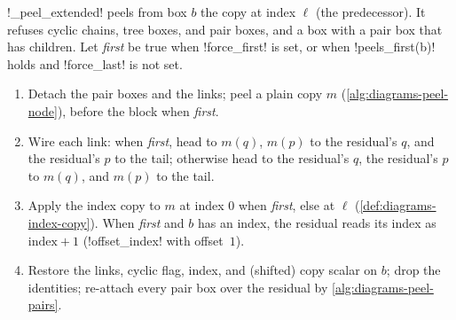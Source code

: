 \begin{algorithm}\label{alg:diagrams-peel-extended}
\py!_peel_extended! peels from box $b$ the copy at index $\ell$ (the predecessor). It refuses cyclic chains, tree boxes, and pair boxes, and a box with a pair box that has children. Let \emph{first} be true when \py!force_first! is set, or when \py!peels_first(b)! holds and \py!force_last! is not set.
\begin{enumerate}
\item Detach the pair boxes and the links; peel a plain copy $m$ (\cref{alg:diagrams-peel-node}), before the block when \emph{first}.
\item Wire each link: when \emph{first}, head to $m(q)$, $m(p)$ to the residual's $q$, and the residual's $p$ to the tail; otherwise head to the residual's $q$, the residual's $p$ to $m(q)$, and $m(p)$ to the tail.
\item Apply the index copy to $m$ at index $0$ when \emph{first}, else at $\ell$ (\cref{def:diagrams-index-copy}). When \emph{first} and $b$ has an index, the residual reads its index as $\text{index}+1$ (\py!offset_index! with offset~$1$).
\item Restore the links, cyclic flag, index, and (shifted) copy scalar on $b$; drop the identities; re-attach every pair box over the residual by \cref{alg:diagrams-peel-pairs}.
\end{enumerate}
\end{algorithm}


